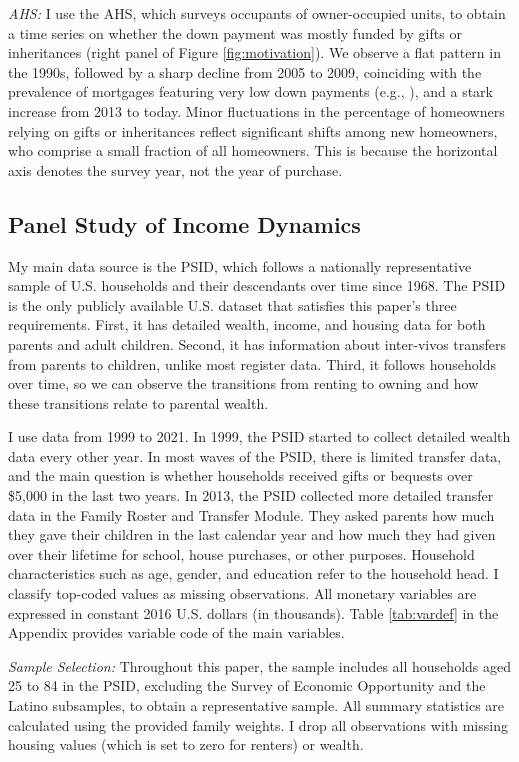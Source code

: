 \documentclass[12pt]{article}
\begin{document}
\textit{AHS:} I use the AHS, which surveys occupants of owner-occupied units, to obtain a time series on whether the down payment was mostly funded by gifts or inheritances (right panel of Figure \ref{fig:motivation}). We observe a flat pattern in the 1990s, followed by a sharp decline from 2005 to 2009, coinciding with the prevalence of mortgages featuring very low down payments (e.g., \cite{Corbae2015}), and a stark increase from 2013 to today. Minor fluctuations in the percentage of homeowners relying on gifts or inheritances reflect significant shifts among new homeowners, who comprise a small fraction of all homeowners. This is because the horizontal axis denotes the survey year, not the year of purchase.


\subsection{Panel Study of Income Dynamics}\label{sec:PSID}
My main data source is the PSID, which follows a nationally representative sample of U.S. households and their descendants over time since 1968. The PSID is the only publicly available U.S. dataset that satisfies this paper's three requirements. First, it has detailed wealth, income, and housing data for both parents and adult children. Second, it has information about inter-vivos transfers from parents to children, unlike most register data. Third, it follows households over time, so we can observe the transitions from renting to owning and how these transitions relate to parental wealth.

I use data from 1999 to 2021. In 1999, the PSID started to collect detailed wealth data every other year. In most waves of the PSID, there is limited transfer data, and the main question is whether households received gifts or bequests over \$5,000 in the last two years. In 2013, the PSID collected more detailed transfer data in the Family Roster and Transfer Module. They asked parents how much they gave their children in the last calendar year and how much they had given over their lifetime for school, house purchases, or other purposes. Household characteristics such as age, gender, and education refer to the household head. I classify top-coded values as missing observations. All monetary variables are expressed in constant 2016 U.S. dollars (in thousands). Table \ref{tab:vardef} in the Appendix provides variable code of the main variables.

\textit{Sample Selection:} Throughout this paper, the sample includes all households aged 25 to 84 in the PSID, excluding the Survey of Economic Opportunity and the Latino subsamples, to obtain a representative sample. All summary statistics are calculated using the provided family weights. I drop all observations with missing housing values (which is set to zero for renters) or wealth.
\end{document}
